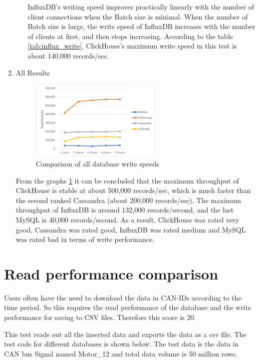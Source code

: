 \begin{enumerate}
\begin{itemize}
InfluxDB's writing speed improves practically linearly with the number of client connections when the Batch size is minimal. When the number of Batch size is large, the write speed of InfluxDB increases with the number of clients at first, and then stops increasing. According to the table \ref{tab:influx_write}, ClickHouse's maximum write speed in this test is about 140,000 records/sec.
\end{itemize}

\item All Results

\begin{figure}[hbt!]
    \centering
    \includegraphics[width=0.6\textwidth]{gfx/all_write_perform.png}
    \caption{Comparison of all database write speeds}
    \label{fig:all_write}
\end{figure}

From the graphs \ref{fig:all_write} it can be concluded that the maximum throughput of ClickHouse is stable at about 500,000 records/sec, which is much faster than the second ranked Cassandra (about 200,000 records/sec). The maximum throughput of InfluxDB is around 132,000 records/second, and the last MySQL is 40,000 records/second. As a result, ClickHouse was rated very good, Cassandra was rated good, InfluxDB was rated medium and MySQL was rated bad in terms of write performance.

\end{enumerate}

\section{Read performance comparison}
Users often have the need to download the data in CAN-IDs according to the time period. So this requires the read performance of the database and the write performance for saving to CSV files. Therefore this score is 20.

This test reads out all the inserted data and exports the data as a csv file. The test code for different databases is shown below. The test data is the data in CAN bus Signal named Motor\_12 and total data volume is 50 million rows.

